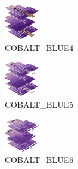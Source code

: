\hspace{0.1cm}
\begin{minipage}[b]{0.15\linewidth}
\begin{figure}[H]                                                          
  \centering                                                             
  \begin{adjustbox}{width=1.5cm,center}                                   
  \includegraphics[width=1.5cm]{src/colorspace_colourflow/flows/colourflow_100-45.png}%
  \end{adjustbox}                                                        
\caption*{COBALT\_BLUE4}                                           
\end{figure}                                                               
\end{minipage}
\hspace{0.1cm}
\begin{minipage}[b]{0.15\linewidth}
\begin{figure}[H]                                                          
  \centering                                                             
  \begin{adjustbox}{width=1.5cm,center}                                   
  \includegraphics[width=1.5cm]{src/colorspace_colourflow/flows/colourflow_101-45.png}%
  \end{adjustbox}                                                        
\caption*{COBALT\_BLUE5}                                           
\end{figure}                                                               
\end{minipage}
\hspace{0.1cm}
\begin{minipage}[b]{0.15\linewidth}
\begin{figure}[H]                                                          
  \centering                                                             
  \begin{adjustbox}{width=1.5cm,center}                                   
  \includegraphics[width=1.5cm]{src/colorspace_colourflow/flows/colourflow_102-45.png}%
  \end{adjustbox}                                                        
\caption*{COBALT\_BLUE6}                                           
\end{figure}                                                               
\end{minipage}
